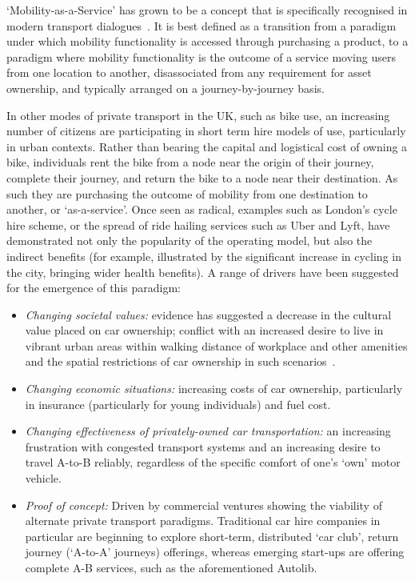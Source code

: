 \documentclass[b5paper,10pt]{article}
\begin{document}
`Mobility-as-a-Service' has grown to be a concept that is specifically
recognised in modern transport dialogues~\citep{tscatapult:2016}. It
is best defined as a transition from a paradigm under which mobility
functionality is accessed through purchasing a product, to a paradigm
where mobility functionality is the outcome of a service moving users
from one location to another, disassociated from any requirement for
asset ownership, and typically arranged on a journey-by-journey basis.

In other modes of private transport in the UK, such as bike use, an
increasing number of citizens are participating in short term hire
models of use, particularly in urban contexts. Rather than bearing the
capital and logistical cost of owning a bike, individuals rent the
bike from a node near the origin of their journey, complete their
journey, and return the bike to a node near their destination. As such
they are purchasing the outcome of mobility from one destination to
another, or `as-a-service'. Once seen as radical, examples such as
London's cycle hire scheme, or the spread of ride hailing services
such as Uber and Lyft, have demonstrated not only the popularity of
the operating model, but also the indirect benefits (for example,
illustrated by the significant increase in cycling in the city,
bringing wider health benefits). A range of drivers have been
suggested for the emergence of this paradigm:

\begin{itemize}
\item {\emph{Changing societal values:}} evidence has
suggested a decrease in the cultural value placed on car ownership;
conflict with an increased desire to live in vibrant urban areas
within walking distance of workplace and other amenities and the
spatial restrictions of car ownership in such
scenarios~\citep{jenks+burgess:2011}.
\item {\emph{Changing economic situations:}} increasing costs of car
ownership, particularly in insurance (particularly for young
individuals) and fuel cost.
\item {\emph{Changing effectiveness of privately-owned car
transportation:}} an increasing frustration with congested transport
systems and an increasing desire to travel A-to-B reliably,
regardless of the specific comfort of one's `own' motor vehicle.
\item {\emph{Proof of concept:}} Driven by commercial ventures showing
the viability of alternate private transport paradigms. Traditional
car hire companies in particular are beginning to explore short-term,
distributed `car club', return journey (`A-to-A' journeys) offerings,
whereas emerging start-ups are offering complete A-B services, such as
the aforementioned Autolib.
\end{itemize}
\end{document}
